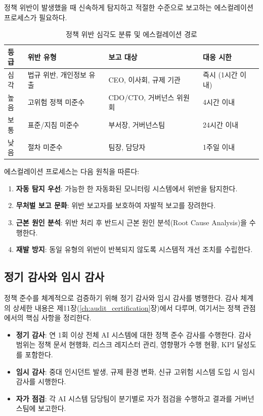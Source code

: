 정책 위반이 발생했을 때 신속하게 탐지하고 적절한 수준으로 보고하는 에스컬레이션 프로세스가 필요하다.

\begin{table}[htbp]
\centering
\caption{정책 위반 심각도 분류 및 에스컬레이션 경로}
\label{tab:violation_escalation}
\begin{tabularx}{\textwidth}{p{1.5cm}p{3cm}p{2.5cm}X}
\toprule
\textbf{등급} & \textbf{위반 유형} & \textbf{보고 대상} & \textbf{대응 시한} \\
\midrule
심각 & 법규 위반, 개인정보 유출 & CEO, 이사회, 규제 기관 & 즉시 (1시간 이내) \\
높음 & 고위험 정책 미준수 & CDO/CTO, 거버넌스 위원회 & 4시간 이내 \\
보통 & 표준/지침 미준수 & 부서장, 거버넌스팀 & 24시간 이내 \\
낮음 & 절차 미준수 & 팀장, 담당자 & 1주일 이내 \\
\bottomrule
\end{tabularx}
\end{table}

에스컬레이션 프로세스는 다음 원칙을 따른다:
\begin{enumerate}
 \item \textbf{자동 탐지 우선}: 가능한 한 자동화된 모니터링 시스템에서 위반을 탐지한다.
 \item \textbf{무처벌 보고 문화}: 위반 보고자를 보호하여 자발적 보고를 장려한다.
 \item \textbf{근본 원인 분석}: 위반 처리 후 반드시 근본 원인 분석(Root Cause Analysis)을 수행한다.
 \item \textbf{재발 방지}: 동일 유형의 위반이 반복되지 않도록 시스템적 개선 조치를 수립한다.
\end{enumerate}

\subsection{정기 감사와 임시 감사}
\label{sec:5.4.3}

정책 준수를 체계적으로 검증하기 위해 정기 감사와 임시 감사를 병행한다. 감사 체계의 상세한 내용은 제11장(\ref{ch:audit_certification}장)에서 다루며, 여기서는 정책 관점에서의 핵심 사항을 정리한다.

\begin{itemize}
 \item \textbf{정기 감사}: 연 1회 이상 전체 AI 시스템에 대한 정책 준수 감사를 수행한다. 감사 범위는 정책 문서 현행화, 리스크 레지스터 관리, 영향평가 수행 현황, KPI 달성도를 포함한다.
 \item \textbf{임시 감사}: 중대 인시던트 발생, 규제 환경 변화, 신규 고위험 시스템 도입 시 임시 감사를 시행한다.
 \item \textbf{자가 점검}: 각 AI 시스템 담당팀이 분기별로 자가 점검을 수행하고 결과를 거버넌스팀에 보고한다.
\end{itemize}


